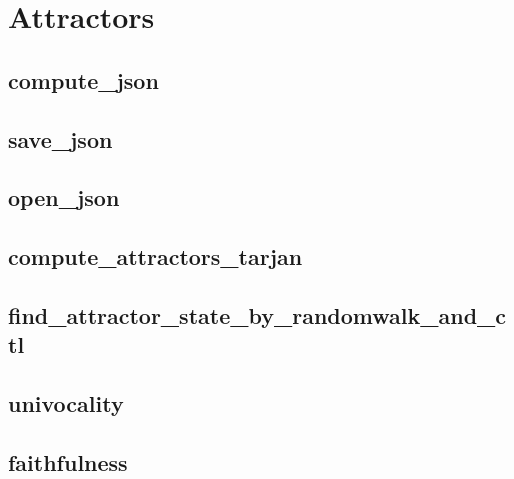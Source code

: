 \documentclass[letterpaper,10pt,english]{sphinxmanual}
\begin{document}
\section{Attractors}
\label{\detokenize{Attractors:attractors}}\label{\detokenize{Attractors::doc}}\label{\detokenize{Attractors:id1}}

\subsection{compute\_json}
\label{\detokenize{Attractors:attractors-compute-json}}\label{\detokenize{Attractors:compute-json}}

\subsection{save\_json}
\label{\detokenize{Attractors:attractors-save-json}}\label{\detokenize{Attractors:save-json}}

\subsection{open\_json}
\label{\detokenize{Attractors:open-json}}\label{\detokenize{Attractors:attractors-open-json}}

\subsection{compute\_attractors\_tarjan}
\label{\detokenize{Attractors:id2}}\label{\detokenize{Attractors:compute-attractors-tarjan}}

\subsection{find\_attractor\_state\_by\_randomwalk\_and\_ctl}
\label{\detokenize{Attractors:find-attractor-state-by-randomwalk-and-ctl}}\label{\detokenize{Attractors:id3}}

\subsection{univocality}
\label{\detokenize{Attractors:univocality}}\label{\detokenize{Attractors:id4}}

\subsection{faithfulness}
\label{\detokenize{Attractors:id5}}\label{\detokenize{Attractors:faithfulness}}
\end{document}
